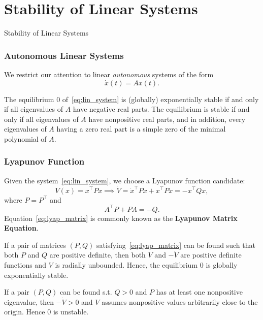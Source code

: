 \section{Stability of Linear Systems}

\begin{frame}
    Stability of Linear Systems


\end{frame}

\begingroup
\small



\begin{frame}
    \frametitle{Autonomous Linear Systems}

    We restrict our attention to linear \textit{autonomous} systems of the form 
    \begin{equation}
        \dot{x}(t) = A x(t).
        \label{eq:lin_system}
    \end{equation}

    \begin{theorem}
        The equilibrium $0$ of~\eqref{eq:lin_system} is (globally) exponentially
        stable if and only if all eigenvalues of $A$ have negative real parts.
        The equilibrium is stable if and only if all eigenvalues of $A$ have
        nonpositive real parts, and in addition, every eigenvalues of $A$ having
        a zero real part is a simple zero of the minimal polynomial of $A$.
    \end{theorem}
\end{frame}

\begin{frame}
    \frametitle{Lyapunov Function}

    Given the system~\eqref{eq:lin_system}, we choose a Lyapunov function
    candidate: \[ V(x) = x^\top P x \implies \dot{V} = \dot{x}^\top P x + x^\top
    P \dot{x} = - x^\top Q x, \] where $P = P^\top$ and 
    \begin{equation}
        A^\top P + PA = -Q.
        \label{eq:lyap_matrix}
    \end{equation}
    Equation~\eqref{eq:lyap_matrix} is commonly known as the \textbf{Lyapunov
    Matrix Equation}.
    \begin{rem}[Stability]
        If a pair of matrices $(P, Q)$ satisfying~\eqref{eq:lyap_matrix} can be
        found such that both $P$ and $Q$ are positive definite, then both $V$
        and $-\dot{V}$ are positive definite functions and $V$ is radially
        unbounded. Hence, the equilibrium $0$ is globally exponentially stable.

        If a pair $(P, Q)$ can be found s.t. $Q > 0$ and $P$ has at least one
        nonpositive eigenvalue, then $-\dot{V} > 0$ and $V$ assumes nonpositive
        values arbitrarily close to the origin. Hence $0$ is unstable.
    \end{rem}
\end{frame}


